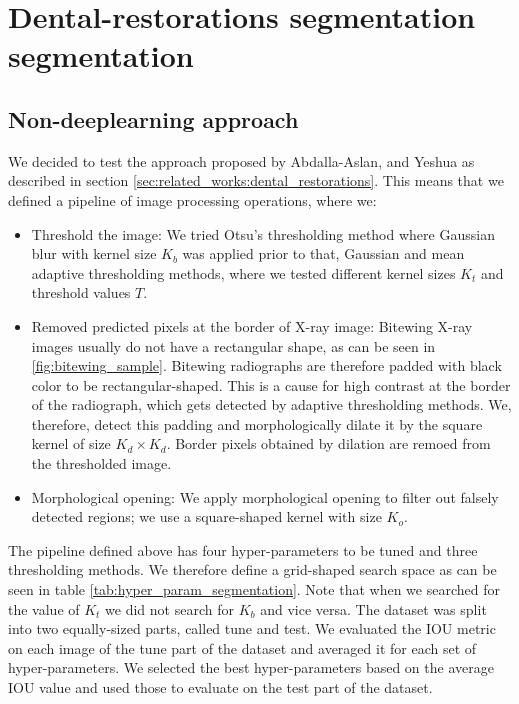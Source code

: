\section{Dental-restorations segmentation segmentation}
\subsection{Non-deeplearning approach}
We decided to test the approach proposed by Abdalla-Aslan, and Yeshua \cite{AbdallaAslan2020, Yeshua2019} as described in section \ref{sec:related_works:dental_restorations}. This means that we defined a pipeline of image processing operations, where we:
\begin{itemize}
    \item Threshold the image: We tried Otsu's thresholding method where Gaussian blur with kernel size $K_b$ was applied prior to that, Gaussian and mean adaptive thresholding methods, where we tested different kernel sizes $K_t$ and threshold values $T$.
    \item Removed predicted pixels at the border of X-ray image: Bitewing X-ray images usually do not have a rectangular shape, as can be seen in \ref{fig:bitewing_sample}. Bitewing radiographs are therefore padded with black color to be rectangular-shaped. This is a cause for high contrast at the border of the radiograph, which gets detected by adaptive thresholding methods. We, therefore, detect this padding and morphologically dilate it by the square kernel of size $K_d \times K_d$. Border pixels obtained by dilation are remoed from the thresholded image.
    \item Morphological opening: We apply morphological opening to filter out falsely detected regions; we use a square-shaped kernel with size $K_o$.
\end{itemize}

The pipeline defined above has four hyper-parameters to be tuned and three thresholding methods. We therefore define a grid-shaped search space as can be seen in table \ref{tab:hyper_param_segmentation}. Note that when we searched for the value of $K_t$ we did not search for $K_b$ and vice versa.
The dataset was split into two equally-sized parts, called tune and test. We evaluated the IOU metric on each image of the tune part of the dataset and averaged it for each set of hyper-parameters. We selected the best hyper-parameters based on the average IOU value and used those to evaluate on the test part of the dataset.


